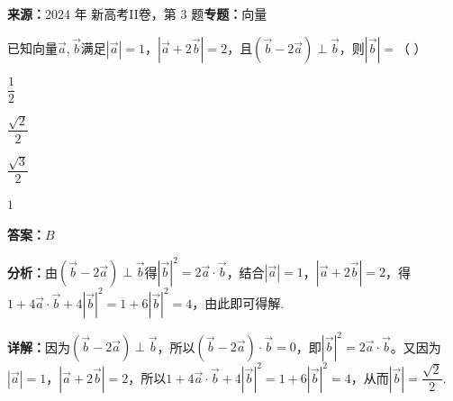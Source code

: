\begin{question}[points=5]
\textbf{来源：}2024 年 新高考II卷，第 3 题\quad \textbf{专题：}向量\par
已知向量$\vec{a}, \vec{b}$满足$|\vec{a}|=1$，$|\vec{a}+2\vec{b}|=2$，且$(\vec{b}-2\vec{a}) \perp \vec{b}$，则$|\vec{b}|=$（ ）
\begin{choices}
  \item $\dfrac{1}{2}$
  \item $\dfrac{\sqrt{2}}{2}$
  \item $\dfrac{\sqrt{3}}{2}$
  \item $1$
\end{choices}
\begin{solution}
\textbf{答案：}$B$

\textbf{分析：}由$(\vec{b}-2\vec{a})\perp\vec{b}$得$|\vec{b}|^2=2\vec{a}\cdot\vec{b}$，结合$|\vec{a}|=1$，$|\vec{a}+2\vec{b}|=2$，得$1+4\vec{a}\cdot\vec{b}+4|\vec{b}|^2=1+6|\vec{b}|^2=4$，由此即可得解.

\textbf{详解：}因为$(\vec{b}-2\vec{a})\perp\vec{b}$，所以$(\vec{b}-2\vec{a})\cdot\vec{b}=0$，即$|\vec{b}|^2=2\vec{a}\cdot\vec{b}$。又因为$|\vec{a}|=1$，$|\vec{a}+2\vec{b}|=2$，所以$1+4\vec{a}\cdot\vec{b}+4|\vec{b}|^2=1+6|\vec{b}|^2=4$，从而$|\vec{b}|=\dfrac{\sqrt{2}}{2}$.
\end{solution}
\end{question}

